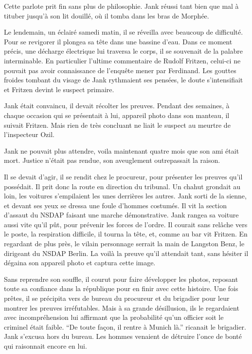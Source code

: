 Cette parlote prit fin sans plus de philosophie.
Jank réussi tant bien que mal à tituber jusqu'à son lit douillé, où il tomba dans les bras de Morphée.

Le lendemain, un éclairé samedi matin, il se réveilla avec beaucoup de difficulté.
Pour se revigorer il plongea sa tête dans une bassine d'eau. 
Dans ce moment précis, une décharge électrique lui traversa le corps, il se souvenait de la palabre interminable.
En particulier l'ultime commentaire de Rudolf Fritzen, celui-ci ne pouvait pas avoir connaissance de l'enquête mener par Ferdinand.
Les gouttes froides tombant du visage de Jank rythmaient ses pensées, le doute s'intensifiait et Fritzen devint le suspect primaire.

Jank était convaincu, il devait récolter les preuves. 
Pendant des semaines, à chaque occasion qui se présentait à lui, appareil photo dans son manteau, il suivait Fritzen.
Mais rien de très concluant ne liait le suspect au meurtre de l'inspecteur Ozil.

Jank ne pouvait plus attendre, voila maintenant quatre mois que son ami était mort.
Justice n'était pas rendue, son aveuglement outrepassait la raison.

Il se devait d'agir, il se rendit chez le procureur, pour présenter les preuves qu'il possédait.
Il prit donc la route en direction du tribunal.
Un chahut grondait au loin, les voitures s'empilaient les unes derrières les autres.
Jank sorti de la sienne, et devant ses yeux se dressa une foule d'hommes costumés.
Il vit la section d'assaut du NSDAP faisant une marche démonstrative.
Jank rangea sa voiture aussi vite qu'il pût, pour prévenir les forces de l'ordre.
Il courait sans relâche vers le poste, la respiration difficile, il tourna la tête, et, comme au bar vit Fritzen.
En regardant de plus près, le vilain personnage serrait la main de Langston Benz, le dirigeant du NSDAP Berlin.
La voilà la preuve qu'il attendait tant, sans hésiter il dégaina son appareil photo et captura cette image.

Sans reprendre son souffle, il courut pour faire développer les photos, reposant toute sa confiance dans la république pour en finir avec cette histoire.
Une fois prêtes, il se précipita vers de bureau du procureur et du brigadier pour leur montrer les preuves irréfutables.
Mais à sa grande désillusion, ils le regardaient avec incompréhension lui affirmant que la probabilité qu'un officier soit le criminel était faible.
\enquote{De toute façon, il rentre à Munich là.} ricanait le brigadier. 
Jank s'excusa hors du bureau. 
Les hommes venaient de détruire l'once de bonté qui raisonnait encore en lui.

